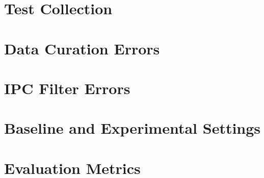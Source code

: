 \section{Test Collection}
\section{Data Curation Errors}
\section{IPC Filter Errors}
\section{Baseline and Experimental Settings}
\section{Evaluation Metrics}


